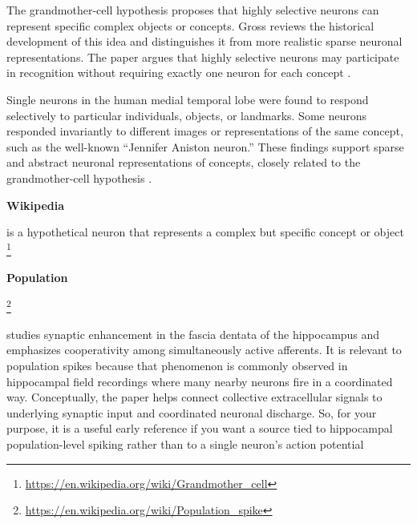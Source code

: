 \documentclass{book}
\providecommand{\ProjectDeepHeading}[2]{%
    \par\medskip\noindent\textbf{#2}\par\smallskip
}
\providecommand{\seeherefooter}[1]{\footnote{\url{#1}}}
\providecommand{\clickurlfooter}[1]{\footnote{\url{#1}}}
\begin{document}

The grandmother-cell hypothesis proposes that highly selective neurons can represent specific complex objects or concepts.
   Gross reviews the historical development of this idea and distinguishes it from more realistic sparse neuronal representations.
   The paper argues that highly selective neurons may participate in recognition without requiring exactly one neuron for each concept \cite{gross-2002-genealogy-of-the-grandmother-cell}.

   Single neurons in the human medial temporal lobe were found to respond selectively to particular individuals, objects, or landmarks.
   Some neurons responded invariantly to different images or representations of the same concept, such as the well-known ``Jennifer Aniston neuron.''
   These findings support sparse and abstract neuronal representations of concepts, closely related to the grandmother-cell hypothesis \cite{quiroga-2005-invariant-visual-representation-by-single-neurons-in-the-human-brain}.

            \ProjectDeepHeading{13}{Wikipedia}
               is a hypothetical neuron that represents a complex but specific concept or object \seeherefooter{https://en.wikipedia.org/wiki/Grandmother_cell}

\ProjectDeepHeading{6}{Population}


\clickurlfooter{https://en.wikipedia.org/wiki/Population_spike}
    
    \cite{mcnaughton-1978-synaptic-enhancement-in-fascia-dentata-cooperativity-among-coactive-afferents} studies synaptic enhancement in the fascia dentata of the hippocampus and emphasizes cooperativity among simultaneously active afferents.
    It is relevant to population spikes because that phenomenon is commonly observed in hippocampal field recordings where many nearby neurons fire in a coordinated way.
    Conceptually, the paper helps connect collective extracellular signals to underlying synaptic input and coordinated neuronal discharge.
    So, for your purpose, it is a useful early reference if you want a source tied to hippocampal population-level spiking rather than to a single neuron’s action potential
\end{document}
